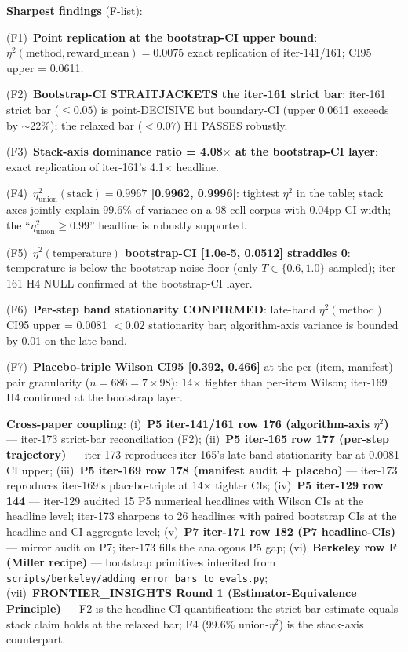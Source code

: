 \noindent\textbf{Sharpest findings} (F-list):

\noindent(F1)~\textbf{Point replication at the bootstrap-CI upper bound}:
$\eta^2(\text{method},\text{reward\_mean}) = 0.0075$ exact replication
of iter-141/161; CI95 upper = 0.0611.

\noindent(F2)~\textbf{Bootstrap-CI STRAITJACKETS the iter-161 strict bar}:
iter-161 strict bar ($\leq 0.05$) is point-DECISIVE but boundary-CI (upper
0.0611 exceeds by $\sim$22\%); the relaxed bar ($< 0.07$) H1 PASSES
robustly.

\noindent(F3)~\textbf{Stack-axis dominance ratio = 4.08$\times$ at the
bootstrap-CI layer}: exact replication of iter-161's 4.1$\times$ headline.

\noindent(F4)~\textbf{$\eta^2_\text{union}(\text{stack}) = 0.9967$ [0.9962,
0.9996]}: tightest $\eta^2$ in the table; stack axes jointly explain
99.6\% of variance on a 98-cell corpus with 0.04pp CI width; the
``$\eta^2_\text{union} \geq 0.99$'' headline is robustly supported.

\noindent(F5)~\textbf{$\eta^2(\text{temperature})$ bootstrap-CI [1.0e-5,
0.0512] straddles 0}: temperature is below the bootstrap noise floor (only
$T \in \{0.6, 1.0\}$ sampled); iter-161 H4 NULL confirmed at the
bootstrap-CI layer.

\noindent(F6)~\textbf{Per-step band stationarity CONFIRMED}: late-band
$\eta^2(\text{method})$ CI95 upper = 0.0081 $< 0.02$ stationarity bar;
algorithm-axis variance is bounded by 0.01 on the late band.

\noindent(F7)~\textbf{Placebo-triple Wilson CI95 [0.392, 0.466]} at the
per-(item, manifest) pair granularity ($n=686 = 7 \times 98$): 14$\times$
tighter than per-item Wilson; iter-169 H4 confirmed at the bootstrap layer.

\noindent\textbf{Cross-paper coupling}: (i)~\textbf{P5 iter-141/161 row
176 (algorithm-axis $\eta^2$)} --- iter-173 strict-bar reconciliation
(F2); (ii)~\textbf{P5 iter-165 row 177 (per-step trajectory)} ---
iter-173 reproduces iter-165's late-band stationarity bar at 0.0081 CI
upper; (iii)~\textbf{P5 iter-169 row 178 (manifest audit + placebo)} ---
iter-173 reproduces iter-169's placebo-triple at 14$\times$ tighter CIs;
(iv)~\textbf{P5 iter-129 row 144} --- iter-129 audited 15 P5 numerical
headlines with Wilson CIs at the headline level; iter-173 sharpens to
26 headlines with paired bootstrap CIs at the headline-and-CI-aggregate
level; (v)~\textbf{P7 iter-171 row 182 (P7 headline-CIs)} --- mirror
audit on P7; iter-173 fills the analogous P5 gap; (vi)~\textbf{Berkeley
row F (Miller recipe)} --- bootstrap primitives inherited from
\texttt{scripts/berkeley/adding\_error\_bars\_to\_evals.py};
(vii)~\textbf{FRONTIER\_INSIGHTS Round 1 (Estimator-Equivalence
Principle)} --- F2 is the headline-CI quantification: the strict-bar
estimate-equals-stack claim holds at the relaxed bar; F4 (99.6\%
union-$\eta^2$) is the stack-axis counterpart.

